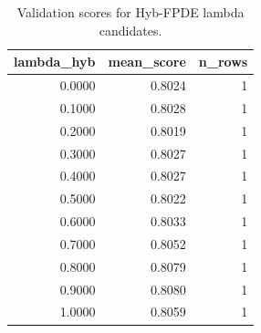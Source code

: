 \begin{table}[t]
\caption{Validation scores for Hyb-FPDE lambda candidates.}
\label{tab:lambda_distribution_computed}
\centering
\begin{tabular}{rrr}
\toprule
lambda\_hyb & mean\_score & n\_rows \\
\midrule
0.0000 & 0.8024 & 1 \\
0.1000 & 0.8028 & 1 \\
0.2000 & 0.8019 & 1 \\
0.3000 & 0.8027 & 1 \\
0.4000 & 0.8027 & 1 \\
0.5000 & 0.8022 & 1 \\
0.6000 & 0.8033 & 1 \\
0.7000 & 0.8052 & 1 \\
0.8000 & 0.8079 & 1 \\
0.9000 & 0.8080 & 1 \\
1.0000 & 0.8059 & 1 \\
\bottomrule
\end{tabular}

\end{table}
